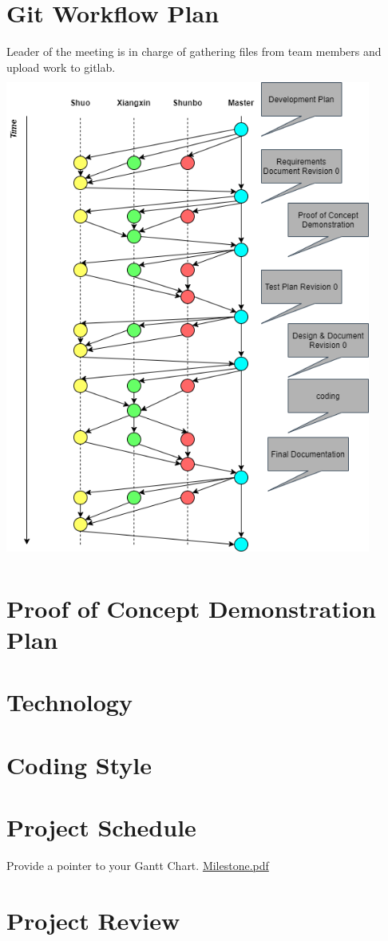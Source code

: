 \documentclass{article}
\begin{document}
\section{Git Workflow Plan}
    Leader of the meeting is in charge of gathering files from team members and upload work to gitlab.\\
    \includegraphics[width=12cm, height=16cm]{GitWorkFlow.png} 
\section{Proof of Concept Demonstration Plan}

\section{Technology}

\section{Coding Style}

\section{Project Schedule}

Provide a pointer to your Gantt Chart.
\href{run:./Milestone.pdf}{Milestone.pdf}

\section{Project Review}
\end{document}
